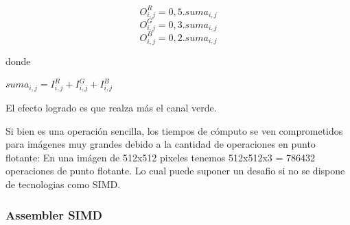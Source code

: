 \begin{center}
$$O_{i,j}^{R} = 0, 5 . suma_{i,j}$$
$$O_{i,j}^{G} = 0, 3 . suma_{i,j}$$
$$O_{i,j}^{B} = 0, 2 . suma_{i,j}$$
\end{center}

donde 

\begin{center}
$suma_{i,j} = I_{i,j}^{R} + I_{i,j}^{G} + I_{i,j}^{B}$
\end{center}

El efecto logrado es que realza más el canal verde. 

\newpage

\begin{figure}
  \centering
  \hfill
\end{figure}

Si bien es una operación sencilla, los tiempos de cómputo se ven comprometidos para imágenes muy grandes debido a la cantidad de operaciones en punto flotante: En una imágen de 512x512 pixeles tenemos 512x512x3 = 786432 operaciones de punto flotante. Lo cual puede suponer un desafio si no se dispone de tecnologias como SIMD.

\subsubsection{Assembler SIMD}

